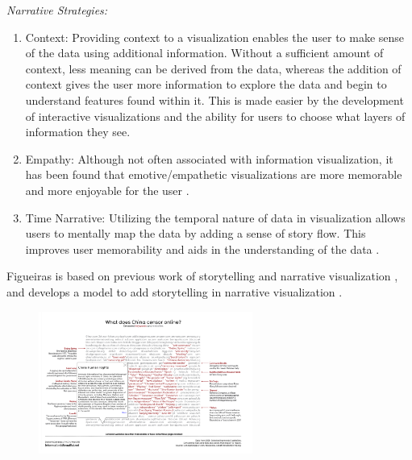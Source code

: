 \documentclass{egpubl}
\begin{document}
\textit{Narrative Strategies:} 
\begin{enumerate}
		
	\item Context: Providing context to a visualization enables the user to make sense of the data using additional information. Without a sufficient amount of context, less meaning can be derived from the data, whereas the addition of context gives the user more information to explore the data and begin to understand features found within it. This is made easier by the development of interactive visualizations and the ability for users to choose what layers of information they see. 
		
	\item Empathy: Although not often associated with information visualization, it has been found that emotive/empathetic visualizations are more memorable and more enjoyable for the user \cite{Kosara}.
		
	\item Time Narrative: Utilizing the temporal nature of data in visualization allows users to mentally map the data by adding a sense of story flow. This improves user memorability and aids in the understanding of the data \cite{Kosara}.
		
\end{enumerate}
Figueiras is based on previous work of storytelling \cite{hullman}\cite{sci}\cite{segal} and narrative visualization \cite{fisher}, and develops a model to add storytelling in narrative visualization \cite{figueiras}.

\begin{figure}
\begingroup
\centering
\includegraphics[width=7cm]{./images/figueiras14narrative}
\label{fig:figueiras14narrative}
\endgroup
\end{figure}
\end{document}
